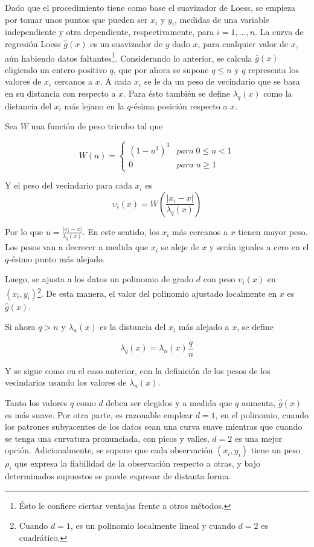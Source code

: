Dado que el procedimiento tiene como base el suavizador de Loess, se empieza por tomar unos puntos que pueden ser $x_i$ y $y_i$, medidas de una variable independiente y otra dependiente, respectivamente, para $i=1,...,n$. La curva de regresión Loess $\hat{g}(x)$ es un suavizador de $y$ dado $x$, para cualquier valor de $x$, aún habiendo datos faltantes\footnote{Ésto le confiere ciertar ventajas frente a otros métodos.}. Considerando lo anterior, se calcula $\hat{g}(x)$ eligiendo un entero positivo $q$, que por ahora se supone $q\leq n$ y $q$ representa los valores de $x_i$ cercanos a $x$. A cada $x_i$ se le da un peso de vecindario que se basa en su distancia con respecto a $x$. Para ésto también se define $\lambda_q(x)$ como la distancia del $x_i$ más lejano en la $q$-ésima posición respecto a $x$. 

Sea 
$W$ una función de peso tricubo tal que


$$
W(u)=\begin{cases}
(1-u^{3})^{3} & para\;0\leq u<1\\
0 & para\;u\geq1
\end{cases}
$$

Y el peso del vecindario para cada $x_i$ es 
$$\upsilon_i(x)=W\left(\frac{\left|x_{i}-x\right|}{\lambda_{q}(x)}\right)$$

Por lo que $u=\frac{\left|x_{i}-x\right|}{\lambda_{q}(x)}$. En este sentido, los $x_i$ más cercanos a $x$ tienen mayor peso. Los pesos van a decrecer a medida que $x_i$ se aleje de $x$ y serán iguales a cero en el $q$-ésimo punto más alejado. 

Luego, se ajusta a los datos un polinomio de grado $d$ con peso $\upsilon_i(x)$ en $(x_i, y_i)$\footnote{Cuando $d=1$, es un polinomio localmente lineal y cuando $d=2$ es cuadrático.}. De esta manera, el valor del polinomio ajustado localmente en $x$ es $\hat{g}(x)$.

Si ahora $q>n$ y $\lambda_n(x)$ es la distancia del $x_i$ más alejado a $x$, se define 

$$
\lambda_q(x)=\lambda_n(x)\frac{q}{n}
$$

Y se sigue como en el caso anterior, con la definición de los pesos de los vecindarios usando los valores de $\lambda_n(x)$. 

Tanto los valores $q$ como $d$ deben ser elegidos y a medida que $q$ aumenta, $\hat{g}(x)$ es más suave. Por otra parte, es razonable emplear $
d=1$, en el polinomio, cuando los patrones subyacentes de los datos sean una curva suave mientras que cuando se tenga una curvatura pronunciada, con picos y valles, $d=2$ es una mejor opción.  Adicionalmente, se supone que cada observación $(x_i,y_i)$ tiene un peso $\rho_i$ que expresa la fiabilidad de la observación respecto a otras, y bajo determinados supuestos se puede expresar de distanta forma.

